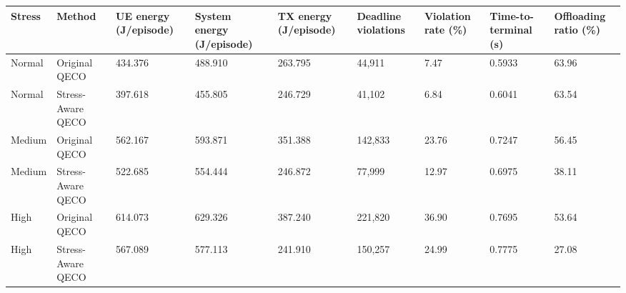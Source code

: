 \begin{tabular}{lllllllll}
\toprule
Stress & Method & UE energy (J/episode) & System energy (J/episode) & TX energy (J/episode) & Deadline violations & Violation rate (\%) & Time-to-terminal (s) & Offloading ratio (\%) \\
\midrule
Normal & Original QECO & 434.376 & 488.910 & 263.795 & 44,911 & 7.47 & 0.5933 & 63.96 \\
Normal & Stress-Aware QECO & 397.618 & 455.805 & 246.729 & 41,102 & 6.84 & 0.6041 & 63.54 \\
Medium & Original QECO & 562.167 & 593.871 & 351.388 & 142,833 & 23.76 & 0.7247 & 56.45 \\
Medium & Stress-Aware QECO & 522.685 & 554.444 & 246.872 & 77,999 & 12.97 & 0.6975 & 38.11 \\
High & Original QECO & 614.073 & 629.326 & 387.240 & 221,820 & 36.90 & 0.7695 & 53.64 \\
High & Stress-Aware QECO & 567.089 & 577.113 & 241.910 & 150,257 & 24.99 & 0.7775 & 27.08 \\
\bottomrule
\end{tabular}
